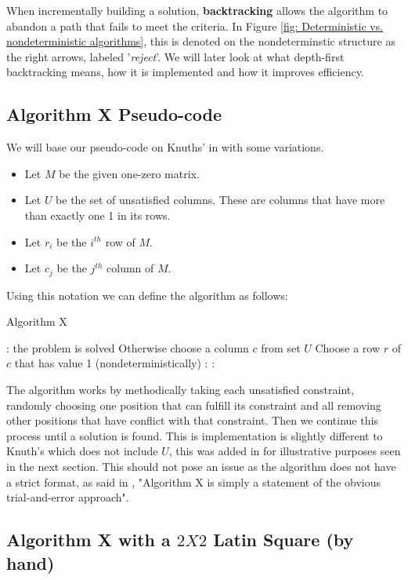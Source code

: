 \documentclass{article}
\begin{document}
When incrementally building a solution, \textbf{backtracking} allows the algorithm to abandon a path that fails to meet the criteria. In Figure \ref{fig: Deterministic vs. nondeterministic algorithms}, this is denoted on the nondeterminstic structure as the right arrows, labeled '\textit{reject}'. We will later look at what depth-first backtracking means, how it is implemented and how it improves efficiency.
\subsection{Algorithm X Pseudo-code}
We will base our pseudo-code on Knuths' in \cite{dlx} with some variations.
\begin{itemize}
\item Let $M$ be the given one-zero matrix.
\item Let $U$ be the set of unsatisfied columns. These are columns that have more than exactly one 1 in its rows.
\item Let  $r_i$ be the $i^{th}$ row of $M$.
\item Let $c_j$ be the $j^{th}$ column of $M$.
\end{itemize}
Using this notation we can define the algorithm as follows:\\

\begin{algorithm}
\caption{Algorithm X}\label{ax} 
\begin{algorithmic}[1]
: the problem is solved  \EndIf
\State Otherwise choose a  column $c$ from set $U$
\State Choose a row $r$ of $c$ that has value 1 (nondeterministically)
: 
: \EndFor
\EndFor
\end{algorithmic}
\end{algorithm}
The algorithm works by methodically taking each unsatisfied constraint, randomly choosing one position that can fulfill its constraint and all removing other positions that have conflict with that constraint. Then we continue this process until a solution is found. This is implementation is slightly different to Knuth's which does not include $U$, this was added in for illustrative purposes seen in the next section. This should not pose an issue as the algorithm does not have a strict format, as said in \cite{dlx}, "Algorithm X is simply a statement of the obvious trial-and-error approach".
\clearpage
\subsection{Algorithm X with a $2 X 2$ Latin Square (by hand)}
\end{document}
